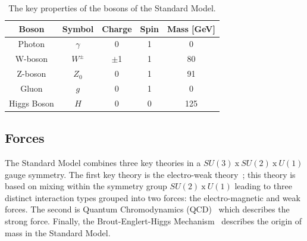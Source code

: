 \begin{itemize}[leftmargin=*]
  {\renewcommand{\arraystretch}{1.5}
  \begin{table}[!ht]
  \begin{center}
    \begin{tabular}{|c||c|c|c|c|}
      \hline
    Boson            & Symbol        & Charge  &  Spin  &  Mass [GeV]\\
    \hline
    Photon           &   $\gamma$    &  0      &  1     &  0 \\
    W-boson          &   $W^{\pm}$    & $\pm$1  &  1     &  80 \\
    Z-boson          &   $Z_0$       &  0      &  1     &  91\\
    Gluon            &   $g$         &  0      &  1     &  0 \\
    Higgs Boson      &   $H$         &  0      &  0     &  125\\
    \hline  
  \end{tabular}
    \caption{The key properties of the bosons of the Standard Model. }
  \label{tab:theo-sm_bosons}
  \end{center}
  \end{table}}
    
\end{itemize}

\subsection{Forces}
\label{sec:theo-sm_forces}

The Standard Model combines three key theories in a
$SU(3)~\text{x}~SU(2)~\text{x}~U(1)$ gauge symmetry.
The first key theory is the electro-weak theory~\cite{theo-glashow};
this theory is based on mixing within the symmetry group $SU(2)~\text{x}~U(1)$
leading to three distinct interaction types grouped into two forces:
the electro-magnetic and weak forces.
The second is Quantum Chromodynamics (QCD)~\cite{theo-qcd} which describes the strong force.
Finally, the Brout-Englert-Higgs Mechanism~\cite{theo-be,theo-higgs} describes the origin of mass in the Standard Model.

